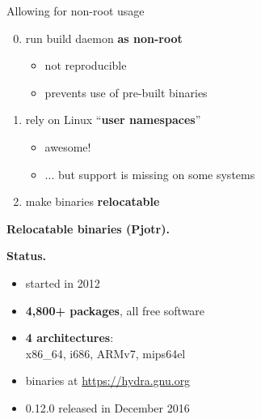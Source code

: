 \documentclass{beamer}
\newcommand{\highlight}[1]{\alert{\textbf{#1}}}
\begin{document}
\begin{frame}{Allowing for non-root usage}

  \Large{
    \begin{enumerate}
      \setcounter{enumi}{-1}
    \item {run build daemon \highlight{as non-root}
      \begin{itemize}
        \item<2-> not reproducible
        \item<2-> prevents use of pre-built binaries
    \end{itemize}}
    \item {rely on Linux ``\highlight{user namespaces}''
      \begin{itemize}
        \item<3-> awesome!
        \item<3-> ... but support is missing on some systems
    \end{itemize}}
    \item make binaries \highlight{relocatable}
    \end{enumerate}
  }
\end{frame}

\begin{frame}
  \Huge{\textbf{Relocatable binaries (Pjotr).}}
\end{frame}

\begin{frame}[plain]
  \Huge{\textbf{Status.}}
\end{frame}

\begin{frame}
  \Large{
  \begin{itemize}
    \item started in 2012
    \item \highlight{4,800+ packages}, all free software
    \item \highlight{4 architectures}:\\
      x86\_64, i686, ARMv7, mips64el
    \item binaries at \url{https://hydra.gnu.org}
    \item 0.12.0 released in December 2016
  \end{itemize}
  }
\end{frame}
\end{document}
